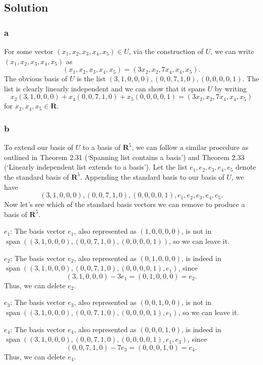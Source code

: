 \documentclass{article}
\begin{document}
\subsection*{Solution}
\subsubsection*{a}
For some vector $(x_1,x_2,x_3,x_4,x_5)\in U$, via the construction of $U$, we can write $(x_1,x_2,x_3,x_4,x_5)$ as 
\[(x_1,x_2,x_3,x_4,x_5)=(3x_2,x_2,7x_4,x_4,x_5).\]
The obvious basis of $U$ is the list $(3,1,0,0,0),(0,0,7,1,0),(0,0,0,0,1)$. The list is clearly linearly independent and we can show that it spans $U$ by writing
\[x_2(3,1,0,0,0)+x_4(0,0,7,1,0)+x_5(0,0,0,0,1)=(3x_2,x_2,7x_4,x_4,x_5)\]
for $x_2,x_4,x_5\in\mathbf{R}$.

\subsubsection*{b}
To extend our basis of $U$ to a basis of $\mathbf{R}^5$, we can follow a similar procedure as outlined in Theorem 2.31 (`Spanning list contains a basis') and Theorem 2.33 (`Linearly independent list extends to a basis'). 
Let the list $e_1,e_2,e_3,e_4,e_5$ denote the standard basis of $\mathbf{R}^5$. 
Appending the standard basis to our basis of $U$, we have
\[(3,1,0,0,0),(0,0,7,1,0),(0,0,0,0,1),e_1,e_2,e_3,e_4,e_5.\]
Now let's see which of the standard basis vectors we can remove to produce a basis of $\mathbf{R}^5$.

$e_1$: The basis vector $e_1$, also represented as $(1,0,0,0,0)$, is not in\newline $\operatorname{span}((3,1,0,0,0),(0,0,7,1,0),(0,0,0,0,1))$, so we can leave it.

$e_2$: The basis vector $e_2$, also represented as $(0,1,0,0,0)$, is indeed in\newline $\operatorname{span}((3,1,0,0,0),(0,0,7,1,0),(0,0,0,0,1),e_1)$, since 
\[(3,1,0,0,0)-3e_1=(0,1,0,0,0)=e_2.\]
Thus, we can delete $e_2$.

$e_3$: The basis vector $e_3$, also represented as $(0,0,1,0,0)$, is not in\newline $\operatorname{span}((3,1,0,0,0),(0,0,7,1,0),(0,0,0,0,1),e_1)$, so we can leave it.

$e_4$: The basis vector $e_4$, also represented as $(0,0,0,1,0)$, is indeed in\newline $\operatorname{span}((3,1,0,0,0),(0,0,7,1,0),(0,0,0,0,1),e_1,e_3)$, since 
\[(0,0,7,1,0)-7e_3=(0,0,0,1,0)=e_4.\]
Thus, we can delete $e_4$. 
\end{document}
